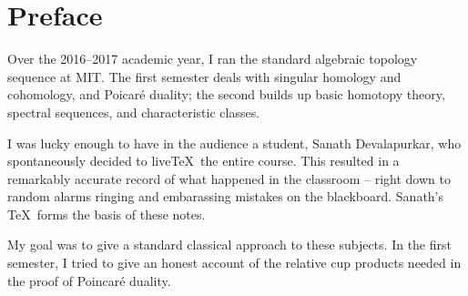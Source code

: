 \cleardoublepage
\section*{Preface}
Over the 2016--2017 academic year, I ran the standard algebraic topology 
sequence at MIT. The first semester deals with singular homology and 
cohomology, and Poicar\'e duality; the second builds up basic homotopy theory,
spectral sequences, and characteristic classes. 

I was lucky enough to have in the audience a student, Sanath Devalapurkar, 
who spontaneously decided to live\TeX \ the entire course. This resulted in 
a remarkably accurate record of what happened in the classroom -- right down
to random alarms ringing and embarassing mistakes on the blackboard. 
Sanath's \TeX \ forms the basis of these notes. 

My goal was to give a standard classical approach to these subjects. 
In the first semester, I tried to give an honest account of the relative cup
products needed in the proof of Poincar\'e duality. 

